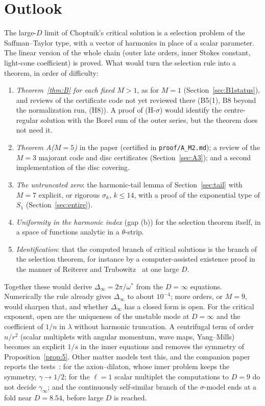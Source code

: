 \documentclass{amsart}
\numberwithin{equation}{section}
\theoremstyle{plain}
\theoremstyle{definition}
\theoremstyle{remark}
\newcommand{\Dinf}{\Delta_\infty}
\newcommand{\repo}[1]{\texttt{#1}}
\begin{document}
\section{Outlook}
\label{sec:outlook}

The large-$D$ limit of Choptuik's critical solution is a selection problem of the Saffman--Taylor type, with a vector of
harmonics in place of a scalar parameter. The linear version of the whole chain (outer late orders, inner Stokes constant,
light-cone coefficient) is proved. What would turn the selection rule into a theorem, in order of difficulty:
\begin{enumerate}[leftmargin=2em]
\item \emph{Theorem~\ref{thm:B} for each fixed $M > 1$}, as for $M = 1$ (Section~\ref{sec:B1status}), and reviews of the
certificate code not yet reviewed there (B5(1), B8 beyond the normalization run, (H8)). A proof of (H-$\sigma$) would
identify the centre-regular solution with the Borel sum of the outer series, but the theorem does not need it.
\item \emph{Theorem A($M = 5$)} in the paper (certified in \repo{proof/A\_M2.md}); a review of the $M = 3$ majorant code
and disc certificates (Section~\ref{sec:A3}); and a second implementation of the disc covering.
\item \emph{The untruncated zero}: the harmonic-tail lemma of Section~\ref{sec:tail} with $M = 7$ explicit, or rigorous
$\sigma_k$, $k \le 14$, with a proof of the exponential type of $S_1$ (Section~\ref{sec:entire}).
\item \emph{Uniformity in the harmonic index} (gap (b)) for the selection theorem itself, in a space of functions analytic in
a $\theta$-strip.
\item \emph{Identification}: that the computed branch of critical solutions is the branch of the selection theorem, for instance
by a computer-assisted existence proof in the manner of Reiterer and Trubowitz~\cite{ReitererTrubowitz2019} at one large $D$.
\end{enumerate}
Together these would derive $\Dinf = 2\pi/\omega^*$ from the $D = \infty$ equations. Numerically the rule already gives $\Dinf$ to
about $10^{-4}$; more orders, or $M = 9$, would sharpen that, and whether $\Dinf$ has a closed form is open. For the critical
exponent, open are the uniqueness of the unstable mode at $D = \infty$ and the coefficient of $1/n$ in $\lambda$ without
harmonic truncation. A
centrifugal term of order $n/r^2$ (scalar multiplets with angular momentum, wave maps, Yang--Mills) becomes an explicit
$1/s$ in the inner equations and removes the symmetry of Proposition~\ref{prop:5}. Other matter models test this, and the
companion paper reports the tests~\cite{companion}: for the axion--dilaton, whose inner problem keeps the symmetry,
$\gamma \to 1/2$; for the $\ell = 1$ scalar multiplet the computations to $D = 9$ do not decide $\gamma_\infty$; and the
continuously self-similar branch of the $\sigma$-model ends at a fold near $D = 8.54$, before large $D$ is reached.
\end{document}
